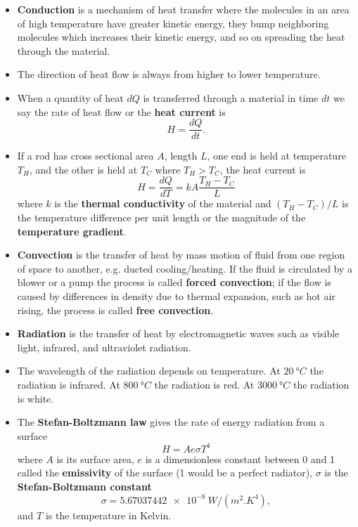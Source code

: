 \documentclass{article}
\begin{document}
\begin{itemize}
  \item \textbf{Conduction} is a mechanism of heat transfer where the molecules in an area of high temperature have greater kinetic energy, they bump neighboring molecules which increases their kinetic energy, and so on spreading the heat through the material.

  \item The direction of heat flow is always from higher to lower temperature.

  \item When a quantity of heat $dQ$ is transferred through a material in time $dt$ we say the rate of heat flow or the \textbf{heat current} is \[H = \frac{dQ}{dt}.\]

  \item If a rod has cross sectional area $A$, length $L$, one end is held at temperature $T_H$, and the other is held at $T_C$ where $T_H > T_C$, the heat current is \[H = \frac{d Q}{d T} = k A \frac{T_H - T_C}{L}\] where $k$ is the \textbf{thermal conductivity} of the material and $(T_H - T_C) / L$ is the temperature difference per unit length or the magnitude of the \textbf{temperature gradient}.

  \item \textbf{Convection} is the transfer of heat by mass motion of fluid from one region of space to another, e.g. ducted cooling/heating. If the fluid is circulated by a blower or a pump the process is called \textbf{forced convection}; if the flow is caused by differences in density due to thermal expansion, such as hot air rising, the process is called \textbf{free convection}.

  \item \textbf{Radiation} is the transfer of heat by electromagnetic waves such as visible light, infrared, and ultraviolet radiation.

  \item The wavelength of the radiation depends on temperature. At $\qty{20}{\degree C}$ the radiation is infrared. At $\qty{800}{\degree C}$ the radiation is red. At $\qty{3000}{\degree C}$ the radiation is white.

  \item The \textbf{Stefan-Boltzmann law} gives the rate of energy radiation from a surface \[H = A e \sigma T^4\] where $A$ is its surface area, $e$ is a dimensionless constant between 0 and 1 called the \textbf{emissivity} of the surface (1 would be a perfect radiator), $\sigma$ is the \textbf{Stefan-Boltzmann constant} \[\sigma = \qty{5.67037442e-8}{W/(m^2.K^4)},\] and $T$ is the temperature in Kelvin.


\end{itemize}
\end{document}
